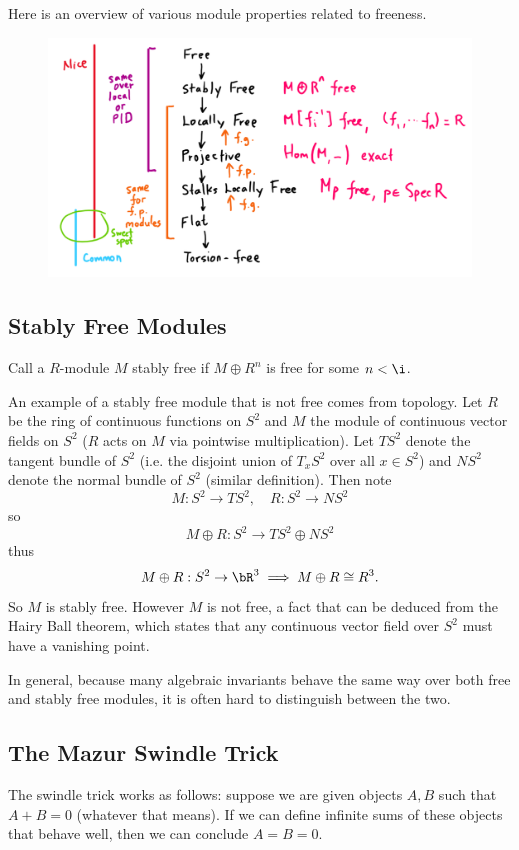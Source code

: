 Here is an overview of various module properties related to freeness.
\begin{figure}[H]
    \centering
    \includegraphics[width=\linewidth]{figures/module-cheat-sheet.png}
\end{figure}

\subsection{Stably Free Modules}
Call a $R$-module $M$ stably free if $M \oplus R^n$ is free for some $n < \i$.

An example of a stably free module that is not free comes from topology. Let $R$ be the ring of continuous functions on $S^2$ and $M$ the module of continuous vector fields on $S^2$ ($R$ acts on $M$ via pointwise multiplication). Let $TS^2$ denote the tangent bundle of $S^2$ (i.e. the disjoint union of $T_xS^2$ over all $x \in S^2$) and $NS^2$ denote the normal bundle of $S^2$ (similar definition). Then note
\[
    M: S^2 \to TS^2, \quad R: S^2 \to NS^2
\]
so
\[
    M \oplus R: S^2 \to TS^2 \oplus NS^2
\]
thus
\[
    M \oplus R: S^2 \to \bR^3 \implies M \oplus R \cong R^3.
\]
So $M$ is stably free. However $M$ is not free, a fact that can be deduced from the Hairy Ball theorem, which states that any continuous vector field over $S^2$ must have a vanishing point.

In general, because many algebraic invariants behave the same way over both free and stably free modules, it is often hard to distinguish between the two.

\subsection{The Mazur Swindle Trick}
The swindle trick works as follows: suppose we are given objects $A, B$ such that $A + B = 0$ (whatever that means). If we can define infinite sums of these objects that behave well, then we can conclude $A = B = 0$.

